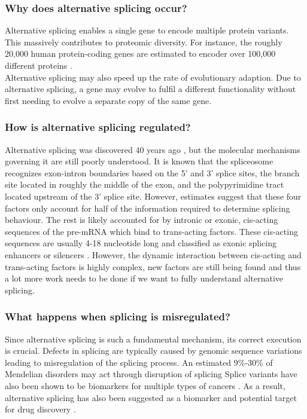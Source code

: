 \subsubsection{Why does alternative splicing occur?}
Alternative splicing enables a single gene to encode multiple protein variants. This massively contributes to proteomic diversity. For instance, the roughly 20,000 human protein-coding genes are estimated to encoder over 100,000 different proteins \cite{splicing_current_perspectives}.\\ 
Alternative splicing may also speed up the rate of evolutionary adaption. Due to alternative splicing, a gene may evolve to fulfil a different functionality without first needing to evolve a separate copy of the same gene. \cite{bretschneiderphdthesis}
\subsubsection{How is alternative splicing regulated?}
Alternative splicing was discovered 40 years ago \cite{discoveryofsplicing}, but the molecular mechanisms governing it are still poorly understood. It is known that the spliceosome recognizes exon-intron boundaries based on the 5' and 3' splice sites, the branch site located in roughly the middle of the exon, and the polypyrimidine tract located upstream of the 3' splice site. However, estimates suggest that these four factors only account for half of the information required to determine splicing behaviour. The rest is likely accounted for by intronic or exonic, cis-acting sequences of the pre-mRNA which bind to trans-acting factors. These cis-acting sequences are usually 4-18 nucleotide long and classified as exonic splicing enhancers or silencers \cite{splicing_current_perspectives}.
However, the dynamic interaction between cis-acting and trans-acting factors is highly complex, new factors are still being found and thus a lot more work needs to be done if we want to fully understand alternative splicing.

\subsubsection{What happens when splicing is misregulated?}
Since alternative splicing is such a fundamental mechanism, its correct execution is crucial. Defects in splicing are typically caused by genomic sequence variations leading to misregulation of the splicing process. An estimated 9\%-30\% of Mendelian disorders may act through disruption of splicing \cite{comparison}
Splice variants have also been shown to be biomarkers for multiple types of cancers \cite{cancer} \cite{splicingcausescancer}. As a result, alternative splicing has also been suggested as a biomarker and potential target for drug discovery \cite{drugdiscoverysplicing}. \\


